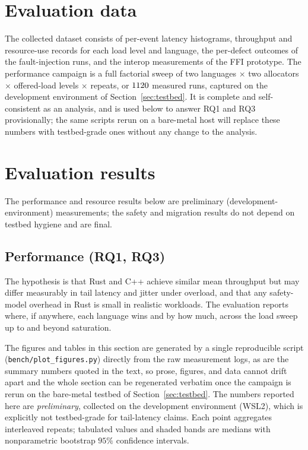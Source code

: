 \documentclass[english,twoside,openright,a4paper,censored,csm,software-track-2020]{HYthesisML}
\begin{document}
\section{Evaluation data}
The collected dataset consists of per-event latency histograms, throughput and resource-use
records for each load level and language, the per-defect outcomes of the fault-injection
runs, and the interop measurements of the FFI prototype. The performance campaign is a full
factorial sweep of two languages $\times$ two allocators $\times$ \NLoadLevels{} offered-load
levels $\times$ \NRepeats{} repeats, or $1120$ measured runs, captured on the development
environment of Section~\ref{sec:testbed}. It is complete and self-consistent as an analysis, and is used
below to answer RQ1 and RQ3 provisionally; the same scripts rerun on a bare-metal host will
replace these numbers with testbed-grade ones without any change to the analysis.

\section{Evaluation results}
The performance and resource results below are preliminary (development-environment)
measurements; the safety and migration results do not depend on testbed hygiene and are final.

\subsection{Performance (RQ1, RQ3)}\label{sec:perfresults}
The hypothesis is that Rust and C++ achieve similar mean throughput but may differ
measurably in tail latency and jitter under overload, and that any safety-model overhead in
Rust is small in realistic workloads. The evaluation reports where, if anywhere, each
language wins and by how much, across the load sweep up to and beyond saturation.

The figures and tables in this section are generated by a single reproducible script
(\texttt{bench/plot\_figures.py}) directly from the raw measurement logs, as are the summary
numbers quoted in the text, so prose, figures, and data cannot drift apart and the whole
section can be regenerated verbatim once the campaign is rerun on the bare-metal testbed of
Section~\ref{sec:testbed}. The numbers reported here are \emph{preliminary}, collected on the
development environment (WSL2), which is explicitly not testbed-grade for tail-latency claims.
Each point aggregates \NRepeats{} interleaved repeats; tabulated values and shaded bands are
medians with nonparametric bootstrap $95\%$ confidence intervals.
\end{document}
